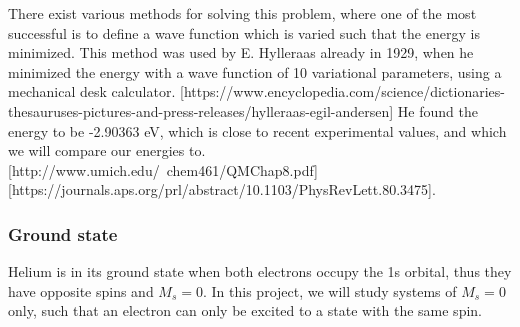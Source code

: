 There exist various methods for solving this problem, where one of the most successful is to define a wave function which is varied such that the energy is minimized. This method was used by E. Hylleraas already in 1929, when he minimized the energy with a wave function of 10 variational parameters, using a mechanical desk calculator. [https://www.encyclopedia.com/science/dictionaries-thesauruses-pictures-and-press-releases/hylleraas-egil-andersen] He found the energy to be -2.90363 eV, which is close to recent experimental values, and which we will compare our energies to.  [http://www.umich.edu/~chem461/QMChap8.pdf][https://journals.aps.org/prl/abstract/10.1103/PhysRevLett.80.3475]. 

\subsubsection{Ground state}
Helium is in its ground state when both electrons occupy the 1s orbital, thus they have opposite spins and $M_s=0$. In this project, we will study systems of $M_s=0$ only, such that an electron can only be excited to a state with the same spin. 

